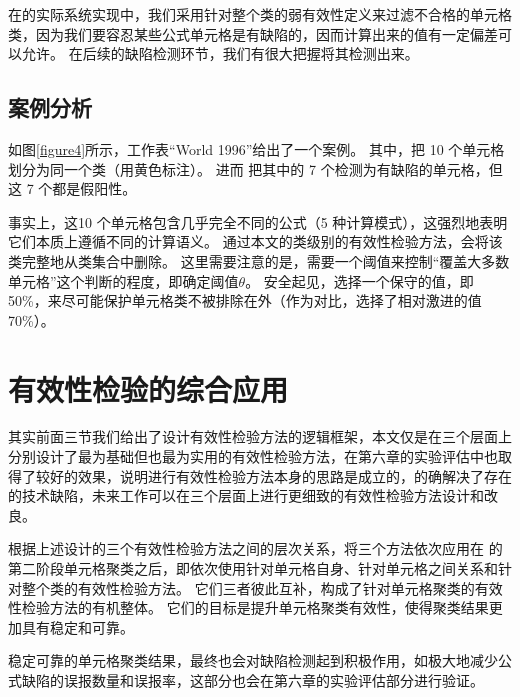 在\wa 的实际系统实现中，我们采用针对整个类的弱有效性定义来过滤不合格的单元格类，因为我们要容忍某些公式单元格是有缺陷的，因而计算出来的值有一定偏差可以允许。
在后续的缺陷检测环节，我们有很大把握将其检测出来。

\subsection*{案例分析}

如图\ref{figure4}所示，工作表“World 1996”给出了一个案例。
其中，\cu 把 10 个单元格划分为同一个类（用黄色标注）。
进而 \cu 把其中的 7 个检测为有缺陷的单元格，但这 7 个都是假阳性。

事实上，这10 个单元格包含几乎完全不同的公式（5 种计算模式），这强烈地表明它们本质上遵循不同的计算语义。
通过本文的类级别的有效性检验方法，\wa 会将该类完整地从类集合中删除。
这里需要注意的是，\wa 需要一个阈值来控制“覆盖大多数单元格”这个判断的程度，即确定阈值$\theta$。
安全起见，\wa 选择一个保守的值，即 50\%，来尽可能保护单元格类不被排除在外（作为对比，\ca 选择了相对激进的值70\%）。


\section{有效性检验的综合应用}
其实前面三节我们给出了设计有效性检验方法的逻辑框架，本文仅是在三个层面上分别设计了最为基础但也最为实用的有效性检验方法，在第六章的实验评估中也取得了较好的效果，说明进行有效性检验方法本身的思路是成立的，的确解决了\cu 存在的技术缺陷，未来工作可以在三个层面上进行更细致的有效性检验方法设计和改良。

根据上述设计的三个有效性检验方法之间的层次关系，\wa 将三个方法依次应用在 \cu 的第二阶段单元格聚类之后，即依次使用针对单元格自身、针对单元格之间关系和针对整个类的有效性检验方法。
它们三者彼此互补，构成了针对单元格聚类的有效性检验方法的有机整体。
它们的目标是提升单元格聚类有效性，使得聚类结果更加具有稳定和可靠。

稳定可靠的单元格聚类结果，最终也会对缺陷检测起到积极作用，如极大地减少公式缺陷的误报数量和误报率，这部分也会在第六章的实验评估部分进行验证。